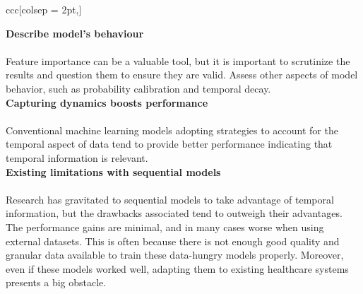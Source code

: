 \begin{table*}[h!]
\begin{tblr}{ccc}[colsep = 2pt,]
\begin{tblr}[T]
           {\textbf{Describe model's behaviour} \\ \vspace{0.1cm} \\ Feature importance can be a valuable tool, but it is important to scrutinize the results and question them to ensure they are valid. Assess other aspects of model behavior, such as probability calibration and temporal decay.} \\
        
           {\textbf{Capturing dynamics boosts performance} \\ \vspace{0.1cm} \\ Conventional machine learning models adopting strategies to account for the temporal aspect of data tend to provide better performance indicating that temporal information is relevant. } \\

           {\textbf{Existing limitations with sequential models} \\ \vspace{0.1cm} \\ Research has gravitated to sequential models to take advantage of temporal information, but the drawbacks associated tend to outweigh their advantages. The performance gains are minimal, and in many cases worse when using external datasets. This is often because there is not enough good quality and granular data available to train these data-hungry models properly. Moreover, even if these models worked well, adapting them to existing healthcare systems presents a big obstacle.} \vspace{0.15cm}



\end{tblr}
\end{tblr}
\end{table*}
